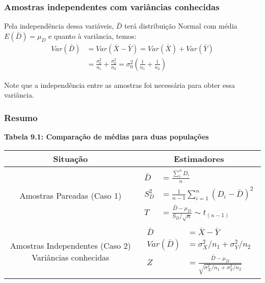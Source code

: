 \documentclass{beamer}
\begin{document}
\begin{frame}
\frametitle{Amostras independentes com variâncias conhecidas}

Pela independência dessa variáveis, \(\bar{D}\) terá distribuição Normal com média \(E(\bar{D})=\mu_D\) e quanto à variância, temos:
\begin{align*}
Var(\bar{D}) &= Var(\bar{X}-\bar{Y}) = Var(\bar{X}) + Var(\bar{Y}) \\
             &= \frac{\sigma^2_0}{n_1}+\frac{\sigma^2_0}{n_2} = \sigma^2_0(\frac{1}{n_1}+\frac{1}{n_2})
\end{align*}

Note que a independência entre as amostras foi necessária para obter essa variância.

\end{frame}

\begin{frame}
\frametitle{Resumo}

\textbf{Tabela 9.1: Comparação de médias para duas populações}

\begin{table}[h]
\tiny
\begin{tabular}{|c|c|}
\hline
Situação  & Estimadores  \\
\hline
Amostras Pareadas (Caso 1)  & 
\parbox{1cm}{\begin{align*}
\bar{D} &= \frac{\sum_i^nD_i}{n} \\
S^2_D &= \frac{1}{n-1}\sum_{i=1}^n(D_i-\bar{D})^2 \\
T &= \frac{\bar{D}-\mu_D}{S_D/\sqrt{n}} \sim t_{(n-1)}
\end{align*}}  \\
\hline
Amostras Independentes (Caso 2) Variâncias conhecidas  & 
\parbox{1cm}{\begin{align*}
\bar{D} &= \bar{X}-\bar{Y} \\
Var(\bar{D}) &= \sigma^2_X/n_1 + \sigma^2_Y/n_2 \\
Z &= \frac{\bar{D}-\mu_D}{\sqrt{\sigma^2_X/n_1 + \sigma^2_Y/n_2}}
\end{align*}} \\
\hline
\end{tabular}
\end{table}
\end{frame}
\end{document}
